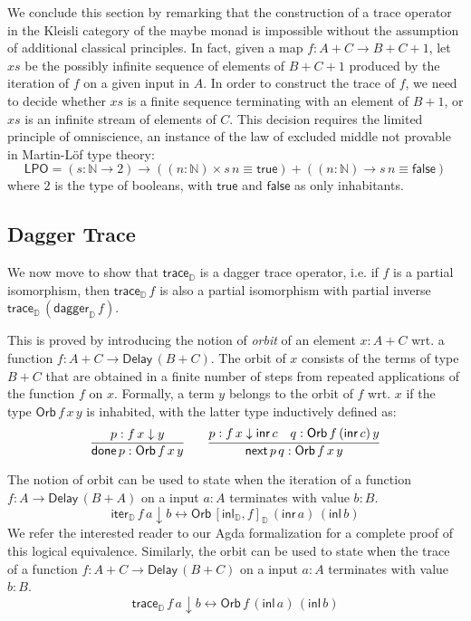 \documentclass[runningheads,a4paper]{llncs}
\newcommand{\inl}{\mathsf{inl}}
\newcommand{\inr}{\mathsf{inr}}
\newcommand{\Delay}{\ensuremath{\mathsf{Delay}\,}}
\newcommand{\dn}{\downarrow}
\newcommand{\D}{\mathbb{D}}
\newcommand{\copairD}[2]{[#1,#2]_{\D}}
\newcommand{\inlD}{\mathsf{inl}_{\D}}
\newcommand{\iterD}{\mathsf{iter}_\D}
\newcommand{\traceD}{\mathsf{trace}_\D}
\newcommand{\daggerD}{\mathsf{dagger}_\D}
\newcommand{\Orb}[3]{\mathsf{Orb}\,#1\,#2\,#3}
\newcommand{\done}{\mathsf{done}}
\renewcommand{\next}{\mathsf{next}}
\begin{document}
We conclude this section by remarking that the construction of a trace
operator in the Kleisli category of the maybe monad is impossible
without the assumption of additional classical principles. In fact,
given a map $f : A + C \to B + C + 1$, let $xs$ be the possibly
infinite sequence of elements of $B + C + 1$ produced by the iteration
of $f$ on a given input in $A$. In order to construct the trace of
$f$, we need to decide whether $xs$ is a finite sequence terminating
with an element of $B + 1$, or $xs$ is an infinite stream of elements
of $C$. This decision requires the limited principle of omniscience,
an instance of the law of excluded middle not provable in Martin-L\"of
type theory:
\[
\mathsf{LPO} = (s : \mathbb{N} \to 2) \to ((n : \mathbb{N}) \times
s\,n \equiv \mathsf{true}) + ((n : \mathbb{N}) \to s\,n \equiv \mathsf{false})
\]
where $2$ is the type of booleans, with $\mathsf{true}$ and
$\mathsf{false}$ as only inhabitants.

\subsection{Dagger Trace}\label{sec:daggertrace}

We now move to show that $\traceD$ is a dagger trace operator,
i.e. if $f$ is a partial isomorphism, then
$\traceD\,f$ is also a partial isomorphism with partial inverse $\traceD\,(\daggerD\,f)$.

This is proved by introducing the notion of \emph{orbit} of an element
$x : A + C$ wrt. a function $f : A + C \to \Delay (B + C)$. The orbit of
$x$ consists of the terms of type $B + C$ that are obtained in a
finite number of steps from repeated applications of the function $f$
on $x$. Formally, a term $y$ belongs to the orbit of $f$ wrt. $x$ if
the type $\Orb f x y $ is inhabited, with the latter type
inductively defined as: 
\[
\infer{\done\,p : \Orb f x y}{p : f \,x \dn y}
\qquad 
\infer{\next\,p \,q : \Orb f x y}{p : f \,x \dn \inr\,c & q : \Orb f
  {(\inr\,c)} y}
\]

The notion of orbit can be used to state when 
the iteration of a function $f : A \to \Delay (B + A)$ on a input
$a : A$ terminates with value $b : B$.
\[
\iterD\,f\,a \dn b \leftrightarrow \Orb {\copairD{\inlD}{f}} {(\inr\,a)} {(\inl\,b)}
\]
We refer the interested reader to our Agda formalization for a complete
proof of this logical equivalence.
Similarly, the orbit can be used to state when 
the trace of a function $f : A + C \to \Delay (B + C)$ on a input
$a : A$ terminates with value $b : B$.
\begin{equation}\label{eq:traceorbit}
\traceD\,f\,a \dn b \leftrightarrow \Orb f{(\inl\,a)} {(\inl\,b)}
\end{equation}
\end{document}
